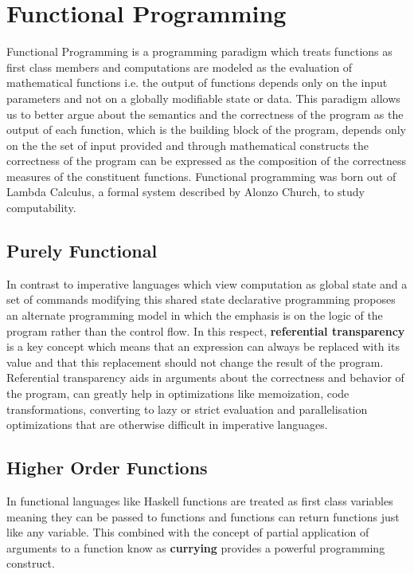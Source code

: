 \chapter{Functional Programming}
\label{chap:FuncProg}

Functional Programming is a programming paradigm which treats functions as first class members
and computations are modeled as the evaluation of mathematical functions i.e. the output of functions
depends only on the input parameters and not on a globally modifiable state or data.
This paradigm allows us to better argue about the semantics and the correctness of the program as the output of each function,
which is the building block of the program, depends only on the the set of input provided and through
mathematical constructs the correctness of the program can be expressed as the composition of the correctness measures
of the constituent functions.
Functional programming was born out of Lambda Calculus, a formal system described by Alonzo Church, to study computability.

\section{Purely Functional}
In contrast to imperative languages which view computation as global state and a set of commands modifying this shared state
declarative programming proposes an alternate programming model in which the emphasis is on the logic of the program rather
than the control flow.
In this respect, \textbf{referential transparency} is a key concept which means that an expression can always be replaced with its
value and that this replacement should not change the result of the program.
Referential transparency aids in arguments about the correctness and behavior of the program, can greatly help in optimizations
like memoization, code transformations, converting to lazy or strict evaluation and parallelisation optimizations that are
otherwise difficult in imperative languages.

\section{Higher Order Functions}
In functional languages like Haskell functions are treated as first class variables meaning they can be passed to functions
and functions can return functions just like any variable. This combined with the concept of partial application of arguments to a
function know as \textbf{currying} provides a powerful programming construct.

